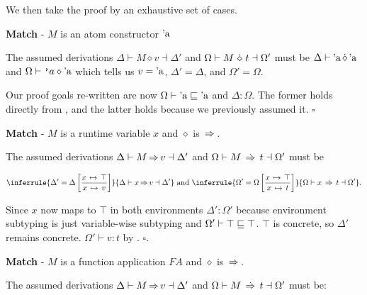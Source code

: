 \documentclass[12pt,twoside]{report}
\begin{document}
We then take the proof by an exhaustive set of cases.

\textbf{Match} - $M$ is an atom constructor $\text{'a}$

The assumed derivations $\Delta \vdash M \diamond v \dashv \Delta'$ and $\Omega \vdash M \,\, \dot{\diamond} \,\, t \dashv \Omega'$ must be $\Delta \vdash \text{'a} \, \dot{\diamond} \, \text{'a}$ and $\Omega \vdash \text{\texttt{'}}a \diamond \text{'a}$ which tells us $v = \text{'a}$, $\Delta' = \Delta$, and $\Omega' = \Omega$.

Our proof goals re-written are now $\Omega \vdash \text{'a} \sqsubseteq \text{'a}$ and $\Delta: \Omega$. The former holds directly from , and the latter holds because we previously assumed it. \hfill $\square$

\textbf{Match} - $M$ is a runtime variable $x$ and $\diamond$ is $\,{\Rightarrow}\,$.

The assumed derivations $\Delta \vdash M \,{\Rightarrow}\, v \dashv \Delta'$ and $\Omega \vdash M \,\stackrel{.}{\Rightarrow}\, t \dashv \Omega'$ must be

\begin{equation}
    \inferrule{
    \Delta' = \Delta\left[\dfrac{\absmap{x}{\top}}{\absmap{x}{v}}\right]
    }{
    \Delta \vdash x \movearrowconc v \dashv \Delta'
    }
    \text{ and }
    \inferrule{
    \Omega' = \Omega\left[\dfrac{\absmap{x}{\top}}{\absmap{x}{t}}\right]
    }{
    \Omega \vdash x \movearrowabs t \dashv \Omega'
    }.
\end{equation}

Since $x$ now maps to $\top$ in both environments $\Delta': \Omega'$ because environment subtyping is just variable-wise subtyping and $\Omega' \vdash \top \sqsubseteq \top$. $\top$ is concrete, so $\Delta'$ remains concrete. $\Omega' \vdash v:t$ by \odef{:}{\Omega}. \hfill $\square$.

\textbf{Match} - $M$ is a function application $F A$ and $\diamond$ is $\,{\Rightarrow}\,$.

The assumed derivations $\Delta \vdash M \,{\Rightarrow}\, v \dashv \Delta'$ and $\Omega \vdash M \,\stackrel{.}{\Rightarrow}\, t \dashv \Omega'$ must be:
\end{document}

